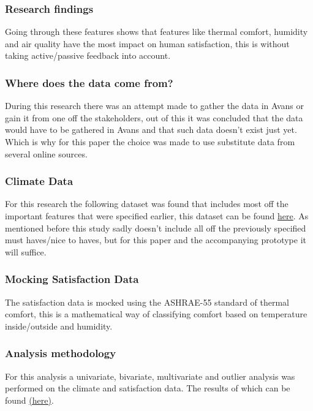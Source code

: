 \documentclass[12pt,a4paper]{article}
\begin{document}
\subsubsection{Research findings} 
Going through these features shows that features like thermal comfort, humidity and air quality have the most impact on human satisfaction, this is without taking active/passive feedback into account. 

\subsubsection{Where does the data come from?}
During this research there was an attempt made to gather the data in Avans or gain it from one off the stakeholders, out of this it was concluded that the data would have to be gathered in Avans and that such data doesn't exist just yet. Which is why for this paper the choice was made to use substitute data from several online sources.

\subsubsection{Climate Data}
For this research the following dataset was found that includes most off the important features that were specified earlier, this dataset can be found \href{https://github.com/IoTsec/Room-Climate-Datasets}{here}. As mentioned before this study sadly doesn't include all off the previously specified must haves/nice to haves, but for this paper and the accompanying prototype it will suffice.

\subsubsection{Mocking Satisfaction Data}
The satisfaction data is mocked using the ASHRAE-55 standard of thermal comfort, this is a mathematical way of classifying comfort based on temperature inside/outside and humidity.

\subsubsection{Analysis methodology}
For this analysis a univariate, bivariate, multivariate and outlier analysis was performed on the climate and satisfaction data. The results of which can be found \href{https://github.com/AvansETI/SmartGridAI}{(here)}.
\end{document}
